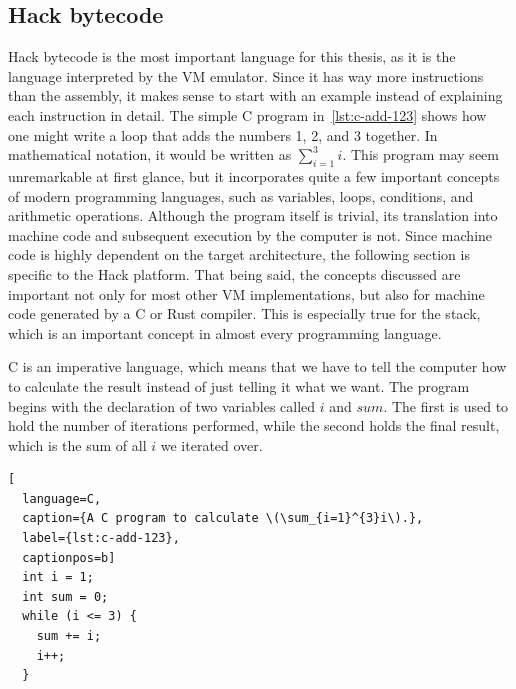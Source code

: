 \subsection{Hack bytecode}
\label{hack-bytecode}
Hack bytecode is the most important language for this thesis, as it is the language interpreted by the VM emulator.
Since it has way more instructions than the assembly, it makes sense to start with an example instead of explaining each instruction in detail.
The simple C program in~\cref{lst:c-add-123} shows how one might write a loop that adds the numbers 1, 2, and 3 together.
In mathematical notation, it would be written as \(\sum_{i=1}^{3}i\).
This program may seem unremarkable at first glance, but it incorporates quite a few important concepts of modern programming languages, such as variables, loops, conditions, and arithmetic operations.
Although the program itself is trivial, its translation into machine code and subsequent execution by the computer is not.
Since machine code is highly dependent on the target architecture, the following section is specific to the Hack platform. That being said, the concepts discussed are important not only for most other VM implementations, but also for machine code generated by a C or Rust compiler.
This is especially true for the stack, which is an important concept in almost every programming language.

C is an imperative language, which means that we have to tell the computer how to calculate the result instead of just telling it what we want.
The program begins with the declaration of two variables called \(i\) and \(sum\).
The first is used to hold the number of iterations performed, while the second holds the final result, which is the sum of all \(i\) we iterated over.

\begin{lstlisting}[
  language=C,
  caption={A C program to calculate \(\sum_{i=1}^{3}i\).},
  label={lst:c-add-123},
  captionpos=b]
  int i = 1;
  int sum = 0;
  while (i <= 3) {
    sum += i;
    i++;
  }
\end{lstlisting}

